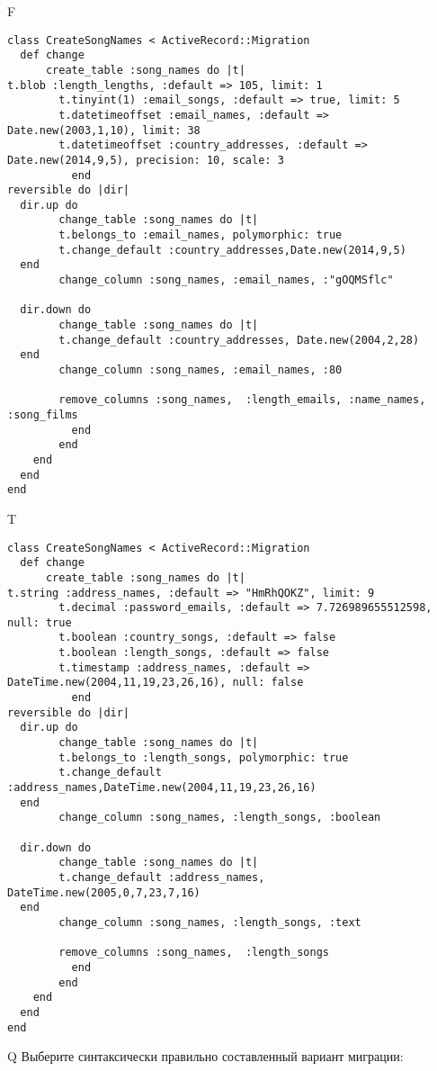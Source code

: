F
\begin{verbatim}
class CreateSongNames < ActiveRecord::Migration
  def change
	  create_table :song_names do |t|
t.blob :length_lengths, :default => 105, limit: 1
		t.tinyint(1) :email_songs, :default => true, limit: 5
		t.datetimeoffset :email_names, :default => Date.new(2003,1,10), limit: 38
		t.datetimeoffset :country_addresses, :default => Date.new(2014,9,5), precision: 10, scale: 3
		  end
reversible do |dir|
  dir.up do
		change_table :song_names do |t|
		t.belongs_to :email_names, polymorphic: true
 		t.change_default :country_addresses,Date.new(2014,9,5)
  end
 		change_column :song_names, :email_names, :"gOQMSflc"
   
  dir.down do
		change_table :song_names do |t|
		t.change_default :country_addresses, Date.new(2004,2,28)
  end
 		change_column :song_names, :email_names, :80
   
		remove_columns :song_names,  :length_emails, :name_names, :song_films 
	      end
	    end
    end 
  end
end

\end{verbatim}

T
\begin{verbatim}
class CreateSongNames < ActiveRecord::Migration
  def change
	  create_table :song_names do |t|
t.string :address_names, :default => "HmRhQOKZ", limit: 9
		t.decimal :password_emails, :default => 7.726989655512598, null: true
		t.boolean :country_songs, :default => false
		t.boolean :length_songs, :default => false
		t.timestamp :address_names, :default => DateTime.new(2004,11,19,23,26,16), null: false
		  end
reversible do |dir|
  dir.up do
		change_table :song_names do |t|
		t.belongs_to :length_songs, polymorphic: true
 		t.change_default :address_names,DateTime.new(2004,11,19,23,26,16)
  end
 		change_column :song_names, :length_songs, :boolean
   
  dir.down do
		change_table :song_names do |t|
		t.change_default :address_names, DateTime.new(2005,0,7,23,7,16)
  end
 		change_column :song_names, :length_songs, :text
   
		remove_columns :song_names,  :length_songs 
	      end
	    end
    end 
  end
end

\end{verbatim}

Q
Выберите синтаксически правильно составленный вариант миграции:

